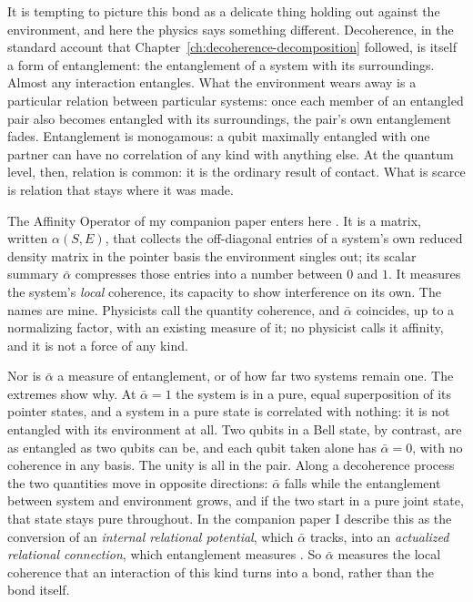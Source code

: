 It is tempting to picture this bond as a delicate thing holding out against the environment, and here the physics says something different. Decoherence, in the standard account that Chapter~\ref{ch:decoherence-decomposition} followed, is itself a form of entanglement: the entanglement of a system with its surroundings. Almost any interaction entangles. What the environment wears away is a particular relation between particular systems: once each member of an entangled pair also becomes entangled with its surroundings, the pair's own entanglement fades. Entanglement is monogamous: a qubit maximally entangled with one partner can have no correlation of any kind with anything else. At the quantum level, then, relation is common: it is the ordinary result of contact. What is scarce is relation that stays where it was made.

The Affinity Operator of my companion paper enters here \citep{AdamsRCT}. It is a matrix, written $\alpha(S,E)$, that collects the off-diagonal entries of a system's own reduced density matrix in the pointer basis the environment singles out; its scalar summary $\bar{\alpha}$ compresses those entries into a number between $0$ and $1$. It measures the system's \emph{local} coherence, its capacity to show interference on its own. The names are mine. Physicists call the quantity coherence, and $\bar{\alpha}$ coincides, up to a normalizing factor, with an existing measure of it; no physicist calls it affinity, and it is not a force of any kind.

Nor is $\bar{\alpha}$ a measure of entanglement, or of how far two systems remain one. The extremes show why. At $\bar{\alpha} = 1$ the system is in a pure, equal superposition of its pointer states, and a system in a pure state is correlated with nothing: it is not entangled with its environment at all. Two qubits in a Bell state, by contrast, are as entangled as two qubits can be, and each qubit taken alone has $\bar{\alpha} = 0$, with no coherence in any basis. The unity is all in the pair. Along a decoherence process the two quantities move in opposite directions: $\bar{\alpha}$ falls while the entanglement between system and environment grows, and if the two start in a pure joint state, that state stays pure throughout. In the companion paper I describe this as the conversion of an \emph{internal relational potential}, which $\bar{\alpha}$ tracks, into an \emph{actualized relational connection}, which entanglement measures \citep{AdamsRCT}. So $\bar{\alpha}$ measures the local coherence that an interaction of this kind turns into a bond, rather than the bond itself.

